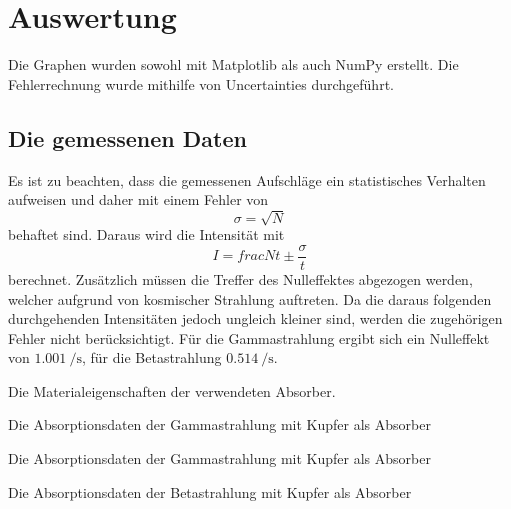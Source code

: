 \section{Auswertung}
\label{sec:Auswertung}


Die Graphen wurden sowohl mit Matplotlib \cite{matplotlib} als auch NumPy \cite{numpy} erstellt. Die
Fehlerrechnung wurde mithilfe von Uncertainties \cite{uncertainties} durchgeführt.

\subsection{Die gemessenen Daten}
Es ist zu beachten, dass die gemessenen Aufschläge ein statistisches Verhalten
aufweisen und daher mit einem Fehler von
\begin{equation}
\sigma = \sqrt{N}
\end{equation}
behaftet sind. Daraus wird die Intensität mit
\begin{equation}
  I = frac{N}{t} \pm \frac{\sigma}{t}
\end{equation}
 berechnet. Zusätzlich müssen die Treffer des Nulleffektes abgezogen werden,
welcher aufgrund von kosmischer Strahlung auftreten. Da die daraus folgenden
durchgehenden Intensitäten jedoch ungleich kleiner sind, werden die zugehörigen
 Fehler nicht berücksichtigt. Für die Gammastrahlung ergibt sich ein
 Nulleffekt von $\SI{1.001}{\per\second}$, für die Betastrahlung $\SI{0.514}{\per\second}$.

 \begin{table}
  \centering
  \caption{Die Materialeigenschaften der verwendeten Absorber.}
  
  \label{tab:rohd}
 \end{table}

\begin{table}
 \centering
 \caption{Die Absorptionsdaten der Gammastrahlung mit Kupfer als Absorber }
 
 \label{tab:k}
\end{table}

\begin{table}
 \centering
 \caption{Die Absorptionsdaten der Gammastrahlung mit Kupfer als Absorber }
 
 \label{tab:e}
\end{table}

\begin{table}
 \centering
 \caption{Die Absorptionsdaten der Betastrahlung mit Kupfer als Absorber }
 
 \label{tab:betaJ}
\end{table}

